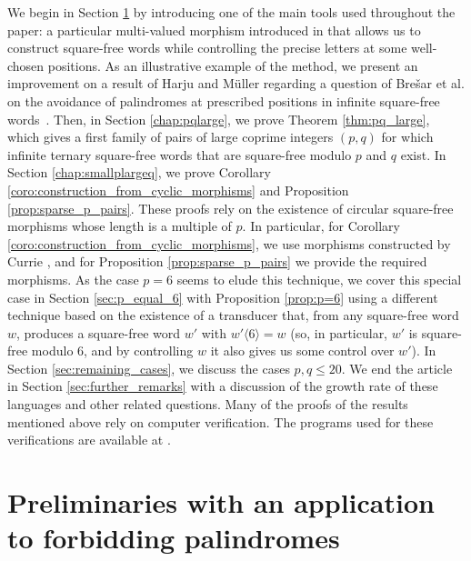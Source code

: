 \documentclass[12pt]{article}
\theoremstyle{definition}
\newcommand{\subsequence}[2]{#1\langle#2\rangle}
\begin{document}
We begin in Section \ref{sec:prel_and_palindromes} by introducing one of the main tools used throughout the paper: a particular multi-valued morphism introduced in \cite{ArithmeticProgressions} that allows us to construct square-free words while controlling the precise letters at some well-chosen positions. As an illustrative example of the method, we present an improvement on a result of Harju and Müller regarding a question of Brešar et al. on the avoidance of palindromes at prescribed positions in infinite square-free words~\cite{HARJU_palindromes,BRESAR_nonrepetitive_coloring_in_trees}.
Then, in Section \ref{chap:pqlarge}, we prove Theorem \ref{thm:pq_large}, which gives a first family of pairs of large coprime integers $(p, q)$ for which infinite ternary square-free words that are square-free modulo $p$ and $q$ exist. In Section \ref{chap:smallplargeq}, we prove Corollary \ref{coro:construction_from_cyclic_morphisms} and Proposition \ref{prop:sparse_p_pairs}. These proofs rely on the existence of circular square-free morphisms whose length is a multiple of $p$. In particular, for Corollary \ref{coro:construction_from_cyclic_morphisms}, we use morphisms constructed by Currie \cite{currie2012infinite}, and for Proposition \ref{prop:sparse_p_pairs} we provide the required morphisms. As the case $p=6$ seems to elude this technique, we cover this special case in Section \ref{sec:p_equal_6} with Proposition \ref{prop:p=6} using a different technique based on the existence of a transducer that, from any square-free word $w$, produces a square-free word $w'$ with $\subsequence{w'}{6}=w$ (so, in particular, $w'$ is square-free modulo $6$, and by controlling $w$ it also gives us some control over $w'$). In Section \ref{sec:remaining_cases}, we discuss the cases $p, q \le 20$. We end the article in Section \ref{sec:further_remarks} with a discussion of the growth rate of these languages and other related questions. Many of the proofs of the results mentioned above rely on computer verification. The programs used for these verifications are available at \cite{code}.

\section{Preliminaries with an application to forbidding palindromes}\label{sec:prel_and_palindromes}
\end{document}
